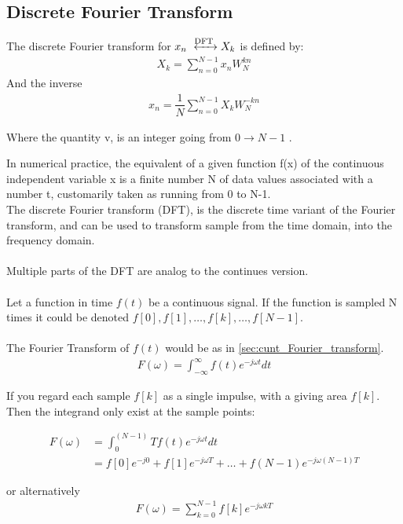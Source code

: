 \subsection{Discrete Fourier Transform}
The discrete Fourier transform for $x_n \xleftrightarrow{\text{DFT}} X_k$ is defined by:
\begin{align*}
	X_k = \sum_{n=0}^{N-1} x_n W_N^{kn}
\end{align*}
And the inverse
\begin{align*}
	x_n = \dfrac{1}{N} \sum_{n=0}^{N-1}X_k W_{N}^{-kn}
\end{align*}

Where the quantity v, is an integer going from $0 \to N-1$
.


In numerical practice, the equivalent of a given function f(x) of the continuous independent variable x is a finite number N of data values associated with a number t, customarily taken as running from 0 to N-1.
\\
The discrete Fourier transform (DFT), is the discrete time variant of the Fourier transform, and can be used to transform sample from the time domain, into the frequency domain.
\\\\
Multiple parts of the DFT are analog to the continues version.
\\\\
Let a function in time $f(t)$ be a continuous signal.
If the function is sampled N times it could be denoted
$f[0],f[1],\dots,f[k],\dots,f[N-1]$.
\\\\
The Fourier Transform of $f(t)$ would be as in \ref{sec:cunt_Fourier_transform}.
\begin{align*}
	F(\omega) = \int_{-\infty}^\infty f(t)e^{-j\omega t} dt
\end{align*}

If you regard each sample $f[k]$ as a single impulse, with a giving area $f[k]$. Then the integrand only exist at the sample points:

\begin{align*}
	F(\omega) 
	&= \int_0^(N-1)T f(t) e^{-j\omega t}dt\\
	&= f[0]e^{-j0} + f[1]e^{-j\omega T} + \dots + f(N-1) e^{-j\omega(N-1)T}	
\end{align*}

or alternatively
\begin{align*}
	F(\omega) = \sum_{k=0}^{N-1}f[k]e^{-j\omega k T}
\end{align*} 

